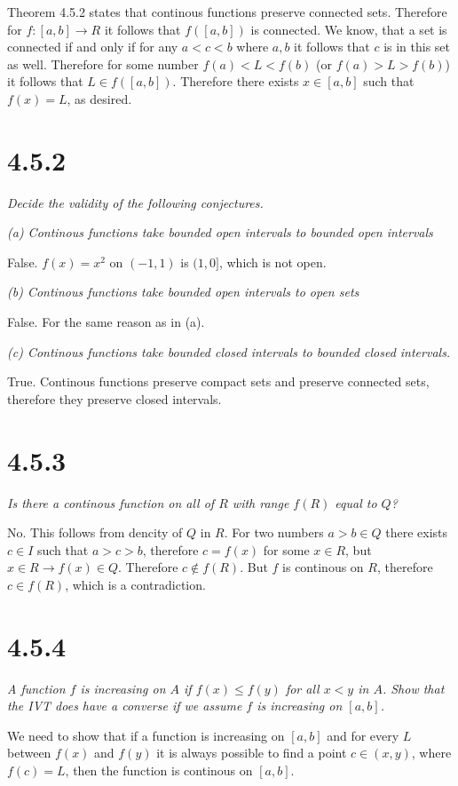 \documentclass[11pt,oneside,titlepage]{book}
\begin{document}
Theorem 4.5.2 states that continous functions preserve connected sets.
Therefore for $f: [a, b] \to  R$ it follows that
$f([a, b])$ is connected. We know, that a set is connected if and only if
for any $a < c < b$ where $a, b$ it follows that $c$ is in this set as well.
Therefore for some number $f(a) < L < f(b)$ (or $f(a) > L > f(b)$) it follows
that $L \in f([a, b])$. Therefore there exists $x \in [a, b]$ such that
$f(x) = L$, as desired.

\section*{4.5.2}
\textit{Decide the validity of the following conjectures.}

\textit{(a) Continous functions take bounded open intervals to bounded open
  intervals }

False. $f(x) = x^2$ on $(-1, 1)$ is $(1, 0]$, which is not open.

\textit{(b) Continous functions take bounded open intervals to open sets }

False. For the same reason as in (a).

\textit{(c) Continous functions take bounded closed intervals to bounded
  closed intervals.}

True. Continous functions preserve compact sets and preserve connected
sets, therefore they preserve closed intervals.

\section*{4.5.3}
\textit{Is there a continous function on all of $R$ with range $f(R)$ equal
  to $Q$?}

No. This follows from dencity of $Q$ in $R$. For two numbers $a > b \in Q$
there exists $c \in I$ such that $a > c > b$, therefore 
$c = f(x)$ for some $x \in R$, but $x \in R \to f(x) \in Q$. Therefore
$c \notin f(R)$. But $f$ is continous on $R$, therefore $c \in f(R)$, which is
a contradiction.

\section*{4.5.4}
\textit{A function $f$ is increasing on $A$ if $f(x) \leq f(y)$ for all
  $x < y$ in $A$. Show that the IVT does have a converse if we assume $f$ is
  increasing on $[a, b]$.}

We need to show that if a function is increasing on $[a, b]$
and for every  $L$  between $f(x)$ and $f(y)$ it is always possible to find
a point $c \in (x, y)$, where $f(c) = L$, then the function is continous
on $[a, b]$.
\end{document}
